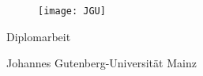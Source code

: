 


\makeatletter
\begin{titlepage}	
  
  \begin{figure}[h]
    \centering
    \texttt{[image: JGU]}
  \end{figure}

  \begin{center}
    \LARGE{\@title}
  \end{center}

  \vfill

  \begin{center}
      \Large{ \@author }

      \large{ \@date   }
  \end{center} 

  \vfill

  \begin{center}
    \Huge{Diplomarbeit}
  \end{center}

  \vfill

  \begin{center}
    \large{Johannes Gutenberg-Universität Mainz}
  \end{center}
  
  \vfill
    
\end{titlepage}
\makeatother
